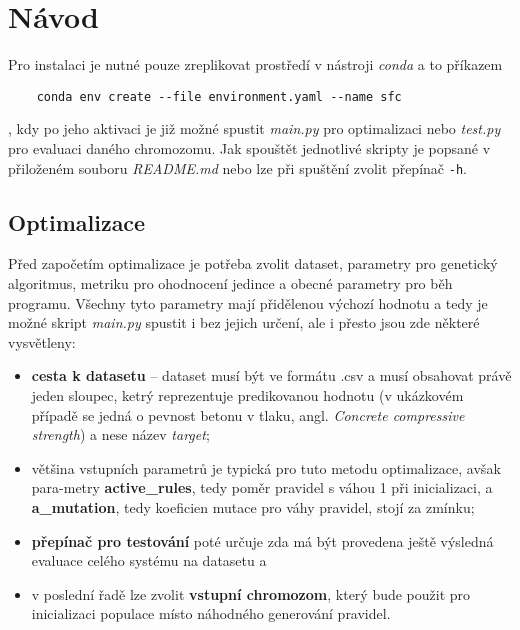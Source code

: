 \documentclass{article}
\begin{document}
\section{Návod}

Pro instalaci je nutné pouze zreplikovat prostředí v nástroji \emph{conda} a to příkazem

\begin{verbatim}
    conda env create --file environment.yaml --name sfc
\end{verbatim}
, kdy po jeho aktivaci je již možné spustit \emph{main.py} pro optimalizaci nebo \emph{test.py} pro evaluaci daného chromozomu. Jak spouštět jednotlivé skripty je popsané v přiloženém souboru \emph{README.md} nebo lze při spuštění zvolit přepínač \texttt{-h}.

\subsection{Optimalizace}

Před započetím optimalizace je potřeba zvolit dataset, parametry pro genetický algoritmus, metriku pro ohodnocení jedince a obecné parametry pro běh programu. Všechny tyto parametry mají přidělenou výchozí hodnotu a tedy je možné skript \emph{main.py} spustit i bez jejich určení, ale i přesto jsou zde některé vysvětleny:

\begin{itemize}

    \item \textbf{cesta k datasetu} -- dataset musí být ve formátu .csv a musí obsahovat právě jeden sloupec, ketrý reprezentuje predikovanou hodnotu (v ukázkovém případě se jedná o pevnost betonu v tlaku, angl. \emph{Concrete compressive strength}) a nese název \emph{target};

    \item většina vstupních parametrů je typická pro tuto metodu optimalizace, avšak para-metry \textbf{active\_rules}, tedy poměr pravidel s váhou 1 při inicializaci, a \textbf{a\_mutation}, tedy koeficien mutace pro váhy pravidel, stojí za zmínku;

    \item \textbf{přepínač pro testování} poté určuje zda má být provedena ještě výsledná evaluace celého systému na datasetu a

    \item v poslední řadě lze zvolit \textbf{vstupní chromozom}, který bude použit pro inicializaci populace místo náhodného generování pravidel.
\end{itemize}
\end{document}
